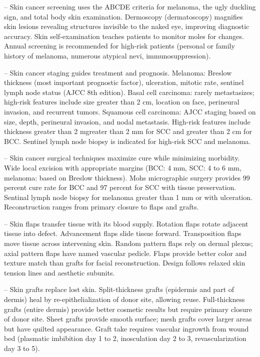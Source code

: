 -- Skin cancer screening uses the ABCDE criteria for melanoma, the ugly duckling sign, and total body skin examination. Dermoscopy (dermatoscopy) magnifies skin lesions revealing structures invisible to the naked eye, improving diagnostic accuracy. Skin self-examination teaches patients to monitor moles for changes. Annual screening is recommended for high-risk patients (personal or family history of melanoma, numerous atypical nevi, immunosuppression).

-- Skin cancer staging guides treatment and prognosis. Melanoma: Breslow thickness (most important prognostic factor), ulceration, mitotic rate, sentinel lymph node status (AJCC 8th edition). Basal cell carcinoma: rarely metastasizes; high-risk features include size greater than 2 cm, location on face, perineural invasion, and recurrent tumors. Squamous cell carcinoma: AJCC staging based on size, depth, perineural invasion, and nodal metastasis. High-risk features include thickness greater than 2 mgreater than 2 mm for SCC and greater than 2 cm for BCC. Sentinel lymph node biopsy is indicated for high-risk SCC and melanoma.

-- Skin cancer surgical techniques maximize cure while minimizing morbidity. Wide local excision with appropriate margins (BCC: 4 mm, SCC: 4 to 6 mm, melanoma: based on Breslow thickness). Mohs micrographic surgery provides 99 percent cure rate for BCC and 97 percent for SCC with tissue preservation. Sentinal lymph node biopsy for melanoma greater than 1 mm or with ulceration. Reconstruction ranges from primary closure to flaps and grafts.

-- Skin flaps transfer tissue with its blood supply. Rotation flaps rotate adjacent tissue into defect. Advancement flaps slide tissue forward. Transposition flaps move tissue across intervening skin. Random pattern flaps rely on dermal plexus; axial pattern flaps have named vascular pedicle. Flaps provide better color and texture match than grafts for facial reconstruction. Design follows relaxed skin tension lines and aesthetic subunits.

-- Skin grafts replace lost skin. Split-thickness grafts (epidermis and part of dermis) heal by re-epithelialization of donor site, allowing reuse. Full-thickness grafts (entire dermis) provide better cosmetic results but require primary closure of donor site. Sheet grafts provide smooth surface; mesh grafts cover larger areas but have quilted appearance. Graft take requires vascular ingrowth from wound bed (plasmatic imbibition day 1 to 2, inosculation day 2 to 3, revascularization day 3 to 5).

